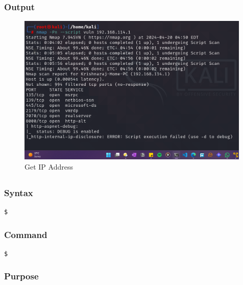 \documentclass[11pt]{article}
\begin{document}
\subsubsection*{Output}
\begin{figure}[H]
    \centering
    \includegraphics[width=0.99\textwidth]{a3_ss (12).png}
    \caption{Get IP Address}
    \label{fig:1}
\end{figure}
\subsection{}

\subsubsection*{Syntax}
\begin{verbatim}
$
\end{verbatim}

\subsubsection*{Command}
\begin{verbatim}
$
\end{verbatim}

\subsubsection*{Purpose}
\end{document}
